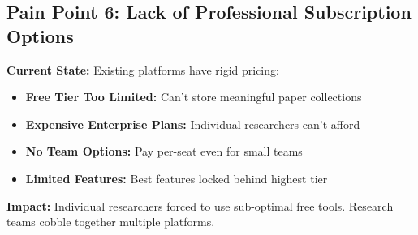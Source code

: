 \subsection{Pain Point 6: Lack of Professional Subscription Options}
\label{subsec:pain-subscription}

\begin{warningbox}
\textbf{Current State:} Existing platforms have rigid pricing:
\begin{itemize}
    \item \textbf{Free Tier Too Limited:} Can't store meaningful paper collections
    \item \textbf{Expensive Enterprise Plans:} Individual researchers can't afford
    \item \textbf{No Team Options:} Pay per-seat even for small teams
    \item \textbf{Limited Features:} Best features locked behind highest tier
\end{itemize}

\textbf{Impact:} Individual researchers forced to use sub-optimal free tools. Research teams cobble together multiple platforms.
\end{warningbox}

